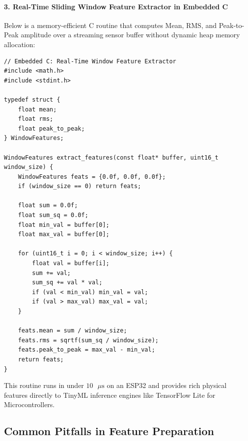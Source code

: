 \begin{iotbox}
\paragraph{3. Real-Time Sliding Window Feature Extractor in Embedded C}
Below is a memory-efficient C routine that computes Mean, RMS, and Peak-to-Peak amplitude over a streaming sensor buffer without dynamic heap memory allocation:

\begin{lstlisting}[style=pythonstyle]
// Embedded C: Real-Time Window Feature Extractor
#include <math.h>
#include <stdint.h>

typedef struct {
    float mean;
    float rms;
    float peak_to_peak;
} WindowFeatures;

WindowFeatures extract_features(const float* buffer, uint16_t window_size) {
    WindowFeatures feats = {0.0f, 0.0f, 0.0f};
    if (window_size == 0) return feats;

    float sum = 0.0f;
    float sum_sq = 0.0f;
    float min_val = buffer[0];
    float max_val = buffer[0];

    for (uint16_t i = 0; i < window_size; i++) {
        float val = buffer[i];
        sum += val;
        sum_sq += val * val;
        if (val < min_val) min_val = val;
        if (val > max_val) max_val = val;
    }

    feats.mean = sum / window_size;
    feats.rms = sqrtf(sum_sq / window_size);
    feats.peak_to_peak = max_val - min_val;
    return feats;
}
\end{lstlisting}
This routine runs in under $10\text{ }\mu\text{s}$ on an ESP32 and provides rich physical features directly to TinyML inference engines like TensorFlow Lite for Microcontrollers.
\end{iotbox}

\subsection{Common Pitfalls in Feature Preparation}\label{subsec:feature_pitfalls}

